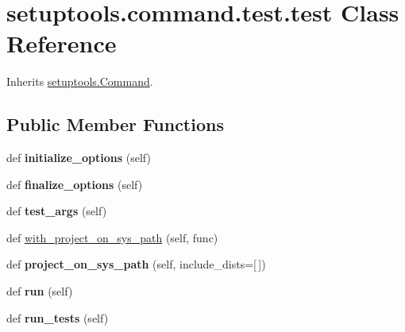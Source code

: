 \hypertarget{classsetuptools_1_1command_1_1test_1_1test}{}\section{setuptools.\+command.\+test.\+test Class Reference}
\label{classsetuptools_1_1command_1_1test_1_1test}


Inherits \hyperlink{classsetuptools_1_1_command}{setuptools.\+Command}.

\subsection*{Public Member Functions}
\begin{DoxyCompactItemize}
\item 
\mbox{\label{classsetuptools_1_1command_1_1test_1_1test_a337f4e04623d21e3cf482973c4c3a5ea}} 
def {\bfseries initialize\+\_\+options} (self)
\item 
\mbox{\label{classsetuptools_1_1command_1_1test_1_1test_a11a76cb9682d8a442ca50e1a3729131f}} 
def {\bfseries finalize\+\_\+options} (self)
\item 
\mbox{\label{classsetuptools_1_1command_1_1test_1_1test_a564891bf89c556a90daa47a113393637}} 
def {\bfseries test\+\_\+args} (self)
\item 
def \hyperlink{classsetuptools_1_1command_1_1test_1_1test_a6031bb41469603a2f2ddc6a0ce6070e6}{with\+\_\+project\+\_\+on\+\_\+sys\+\_\+path} (self, func)
\item 
\mbox{\label{classsetuptools_1_1command_1_1test_1_1test_a0b522fa707ccd2575e5db99d32cd5226}} 
def {\bfseries project\+\_\+on\+\_\+sys\+\_\+path} (self, include\+\_\+dists=\mbox{[}$\,$\mbox{]})
\item 
\mbox{\label{classsetuptools_1_1command_1_1test_1_1test_a9db00a1ed286f1957d4dd53fb4612f21}} 
def {\bfseries run} (self)
\item 
\mbox{\label{classsetuptools_1_1command_1_1test_1_1test_abc29aa4e0fa9e427b0c7e08e318e2941}} 
def {\bfseries run\+\_\+tests} (self)
\end{DoxyCompactItemize}
